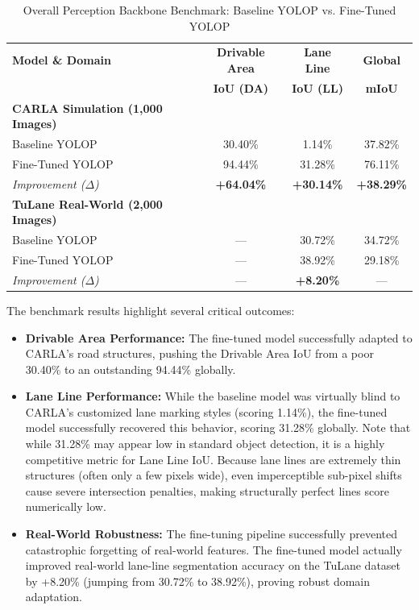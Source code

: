 \documentclass[sn-mathphys,Numbered]{sn-jnl}
\begin{document}
\begin{table}[htbp]
\centering
\caption{Overall Perception Backbone Benchmark: Baseline YOLOP vs. Fine-Tuned YOLOP}
\label{tab:perception_benchmark}
\begin{tabular}{lccc}
\hline
\textbf{Model \& Domain} & \textbf{Drivable Area} & \textbf{Lane Line} & \textbf{Global} \\
 & \textbf{IoU (DA)} & \textbf{IoU (LL)} & \textbf{mIoU} \\
\hline
\textbf{CARLA Simulation (1,000 Images)} & & & \\
\quad Baseline YOLOP & 30.40\% & 1.14\% & 37.82\% \\
\quad Fine-Tuned YOLOP & 94.44\% & 31.28\% & 76.11\% \\
\quad \textit{Improvement ($\Delta$)} & \textbf{+64.04\%} & \textbf{+30.14\%} & \textbf{+38.29\%} \\
\hline
\textbf{TuLane Real-World (2,000 Images)} & & & \\
\quad Baseline YOLOP & — & 30.72\% & 34.72\% \\
\quad Fine-Tuned YOLOP & — & 38.92\% & 29.18\% \\
\quad \textit{Improvement ($\Delta$)} & — & \textbf{+8.20\%} & — \\
\hline
\end{tabular}
\end{table}

The benchmark results highlight several critical outcomes:
\begin{itemize}
    \item \textbf{Drivable Area Performance:} The fine-tuned model successfully adapted to CARLA's road structures, pushing the Drivable Area IoU from a poor 30.40\% to an outstanding 94.44\% globally.
    \item \textbf{Lane Line Performance:} While the baseline model was virtually blind to CARLA's customized lane marking styles (scoring 1.14\%), the fine-tuned model successfully recovered this behavior, scoring 31.28\% globally. Note that while 31.28\% may appear low in standard object detection, it is a highly competitive metric for Lane Line IoU. Because lane lines are extremely thin structures (often only a few pixels wide), even imperceptible sub-pixel shifts cause severe intersection penalties, making structurally perfect lines score numerically low.
    \item \textbf{Real-World Robustness:} The fine-tuning pipeline successfully prevented catastrophic forgetting of real-world features. The fine-tuned model actually improved real-world lane-line segmentation accuracy on the TuLane dataset by +8.20\% (jumping from 30.72\% to 38.92\%), proving robust domain adaptation.
\end{itemize}
\end{document}
